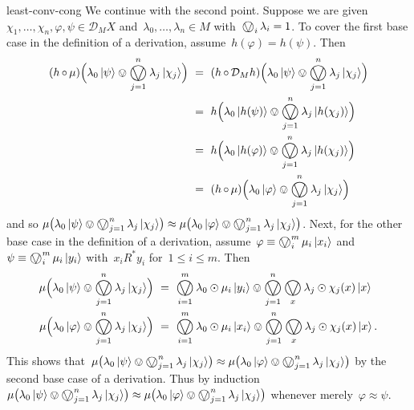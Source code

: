 \begin{solution}{least-conv-cong}
We continue with the second point.
    Suppose we are given~$\chi_1, \ldots, \chi_n, \varphi,\psi \in \mathcal{D}_M X$
    and~$\lambda_0, \ldots, \lambda_n \in M$
        with~$\bigovee_i \lambda_i = 1$.
To cover the first base case in the definition
    of a derivation, assume~$h(\varphi) = h(\psi)$.
Then
\begin{align*}
    (h \after \mu) \Bigl(\lambda_0 \ket{\psi} \ovee \bigovee_{j=1}^n \lambda_j \ket{\chi_j}\Bigr)
    & \ = \ 
    (h \after \mathcal{D}_M h) \Bigl(\lambda_0 \ket{\psi} \ovee \bigovee_{j=1}^n \lambda_j \ket{\chi_j}\Bigr) \\
    & \ = \ 
    h  \Bigl(\lambda_0 \ket{h(\psi)} \ovee \bigovee_{j=1}^n \lambda_j \ket{h(\chi_j)}\Bigr) \\
    & \ = \ 
    h  \Bigl(\lambda_0 \ket{h(\varphi)} \ovee \bigovee_{j=1}^n \lambda_j \ket{h(\chi_j)}\Bigr) \\
    & \ = \ 
    (h \after \mu) \Bigl(\lambda_0 \ket{\varphi} \ovee \bigovee_{j=1}^n \lambda_j \ket{\chi_j}\Bigr)
\end{align*}
and so
    $\mu \bigl(\lambda_0 \ket{\psi} \ovee \bigovee_{j=1}^n \lambda_j \ket{\chi_j}\bigr)
     \approx  
    \mu \bigl(\lambda_0 \ket{\varphi} \ovee \bigovee_{j=1}^n \lambda_j \ket{\chi_j}\bigr)$.
Next, for the other base case in the definition of a derivation,
    assume~$\varphi \equiv \bigovee_i^m \mu_i \ket{x_i}$
    and~$\psi \equiv \bigovee_i^m \mu_i \ket{y_i}$
    with~$x_i \mathrel{R^*} y_i$ for~$1 \leq i \leq m$.
Then
\begin{align*}
    \mu \Bigl(\lambda_0 \ket{\psi} \ovee \bigovee_{j=1}^n \lambda_j \ket{\chi_j}\Bigr)
    & \ = \  
    \bigovee_{i=1}^m \lambda_0 \odot \mu_i \ket{y_i}
    \ovee \bigovee_{j=1}^n \bigovee_x \lambda_j \odot \chi_j(x) \ket{x}\\
    \mu \Bigl(\lambda_0 \ket{\varphi} \ovee \bigovee_{j=1}^n \lambda_j \ket{\chi_j}\Bigr)
    & \ = \  
    \bigovee_{i=1}^m \lambda_0 \odot \mu_i \ket{x_i}
    \ovee \bigovee_{j=1}^n \bigovee_x \lambda_j \odot \chi_j(x) \ket{x}.
\end{align*}
This shows that~$\mu \bigl(\lambda_0 \ket{\psi} \ovee \bigovee_{j=1}^n \lambda_j \ket{\chi_j}\bigr)
     \approx  
    \mu \bigl(\lambda_0 \ket{\varphi} \ovee \bigovee_{j=1}^n \lambda_j \ket{\chi_j}\bigr)$ by the second base case of a derivation.
Thus by induction~$\mu \bigl(\lambda_0 \ket{\psi} \ovee \bigovee_{j=1}^n \lambda_j \ket{\chi_j}\bigr)
     \approx  
    \mu \bigl(\lambda_0 \ket{\varphi} \ovee \bigovee_{j=1}^n \lambda_j \ket{\chi_j}\bigr)$ whenever merely~$\varphi \approx \psi$.


\end{solution}
